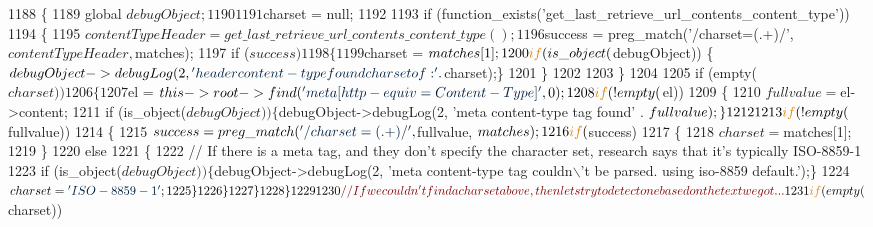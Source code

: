 \begin{DoxyCode}
1188     \{
1189         global $debugObject;
1190 
1191         $charset = null;
1192 
1193         \textcolor{keywordflow}{if} (function\_exists(\textcolor{stringliteral}{'get\_last\_retrieve\_url\_contents\_content\_type'}))
1194         \{
1195             $contentTypeHeader = get\_last\_retrieve\_url\_contents\_content\_type();
1196             $success = preg\_match(\textcolor{stringliteral}{'/charset=(.+)/'}, $contentTypeHeader, $matches);
1197             \textcolor{keywordflow}{if} ($success)
1198             \{
1199                 $charset = $matches[1];
1200                 \textcolor{keywordflow}{if} (is\_object($debugObject)) \{$debugObject->debugLog(2, \textcolor{stringliteral}{'header content-type found charset
       of: '} . $charset);\}
1201             \}
1202 
1203         \}
1204 
1205         \textcolor{keywordflow}{if} (empty($charset))
1206         \{
1207             $el = $this->root->find(\textcolor{stringliteral}{'meta[http-equiv=Content-Type]'},0);
1208             \textcolor{keywordflow}{if} (!empty($el))
1209             \{
1210                 $fullvalue = $el->content;
1211                 \textcolor{keywordflow}{if} (is\_object($debugObject)) \{$debugObject->debugLog(2, \textcolor{stringliteral}{'meta content-type tag found'} . 
      $fullvalue);\}
1212 
1213                 \textcolor{keywordflow}{if} (!empty($fullvalue))
1214                 \{
1215                     $success = preg\_match(\textcolor{stringliteral}{'/charset=(.+)/'}, $fullvalue, $matches);
1216                     \textcolor{keywordflow}{if} ($success)
1217                     \{
1218                         $charset = $matches[1];
1219                     \}
1220                     \textcolor{keywordflow}{else}
1221                     \{
1222                         \textcolor{comment}{// If there is a meta tag, and they don't specify the character set, research says
       that it's typically ISO-8859-1}
1223                         \textcolor{keywordflow}{if} (is\_object($debugObject)) \{$debugObject->debugLog(2, \textcolor{stringliteral}{'meta content-type tag
       couldn\(\backslash\)'t be parsed. using iso-8859 default.'});\}
1224                         $charset = \textcolor{stringliteral}{'ISO-8859-1'};
1225                     \}
1226                 \}
1227             \}
1228         \}
1229 
1230         \textcolor{comment}{// If we couldn't find a charset above, then lets try to detect one based on the text we got...}
1231         \textcolor{keywordflow}{if} (empty($charset))

\end{DoxyCode}
